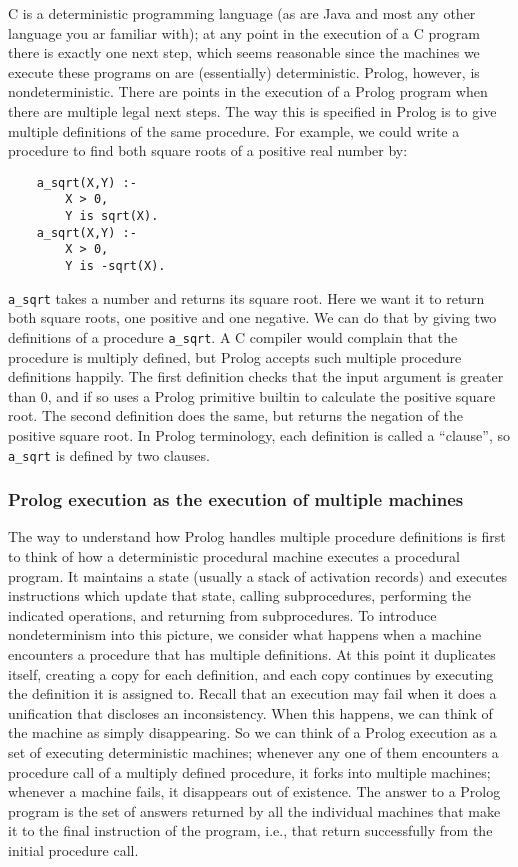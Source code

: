 C is a deterministic programming language (as are Java and most any other language you ar familiar with);
at any point in the execution of a C program there is exactly one
next step, which seems reasonable since the machines we execute these programs on are (essentially) deterministic.  
Prolog, however, is nondeterministic.  There are points in
the execution of a Prolog program when there are multiple legal next
steps.  The way this is specified in Prolog is to give multiple
definitions of the same procedure.  For example, we could write a
procedure to find both square roots of a positive real number by:
\begin{verbatim}
    a_sqrt(X,Y) :-
        X > 0,
        Y is sqrt(X).
    a_sqrt(X,Y) :-
        X > 0,
        Y is -sqrt(X).
\end{verbatim}
\verb|a_sqrt| takes a number and returns its square root.  Here we want it
to return both square roots, one positive and one negative.  We can do
that by giving two definitions of a procedure \verb|a_sqrt|.  A C
compiler would complain that the procedure is multiply defined, but
Prolog accepts such multiple procedure definitions happily.  The first
definition checks that the input argument is greater than 0, and if so
uses a Prolog primitive builtin to calculate the positive square root.
The second definition does the same, but returns the negation of the
positive square root.  In Prolog terminology, each definition is
called a ``clause'', so \verb|a_sqrt| is defined by two clauses.

\subsubsection{Prolog execution as the execution of multiple machines}

The way to understand how Prolog handles multiple procedure
definitions is first to think of how a deterministic procedural
machine executes a procedural program.  It maintains a state (usually
a stack of activation records) and executes instructions which update
that state, calling subprocedures, performing the indicated
operations, and returning from subprocedures.  To introduce
nondeterminism into this picture, we consider what happens when a
machine encounters a procedure that has multiple definitions. At this
point it duplicates itself, creating a copy for each definition, and
each copy continues by executing the definition it is assigned to.
Recall that an execution may fail when it does a unification that
discloses an inconsistency.  When this happens, we can think of the
machine as simply disappearing.  So we can think of a Prolog execution
as a set of executing deterministic machines; whenever any one of them
encounters a procedure call of a multiply defined procedure, it forks
into multiple machines; whenever a machine fails, it disappears out of
existence.  The answer to a Prolog program is the set of answers
returned by all the individual machines that make it to the final
instruction of the program, i.e., that return successfully from the
initial procedure call.

